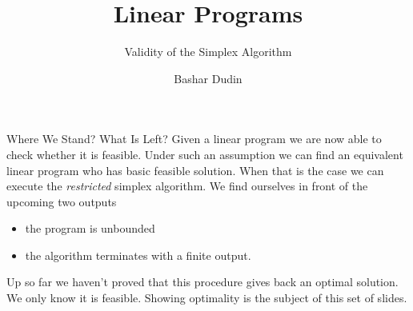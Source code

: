 \documentclass[32pt, aspectratio = 169]{beamer}
\author[BD]{Bashar Dudin}
\institute[]{EPITA}
\title{Linear Programs} %
\subtitle{Validity of the Simplex Algorithm}
\begin{document}
\begin{frame}[plain]
    \titlepage %
\end{frame}

\begin{frame}{Where We Stand? What Is Left?}
    Given a linear program we are now able to check whether it is feasible. Under such an assumption we can find an equivalent linear program who has basic feasible solution. When that is the case we can execute the \textit{restricted} simplex algorithm. We find ourselves in front of the upcoming two outputs
    \begin{itemize}
        \item the program is unbounded
        \item the algorithm terminates with a finite output.
    \end{itemize}
    Up so far we haven't proved that this procedure gives back an optimal solution. We only know it is feasible. Showing optimality is the subject of this set of slides.
\end{frame}
\end{document}
